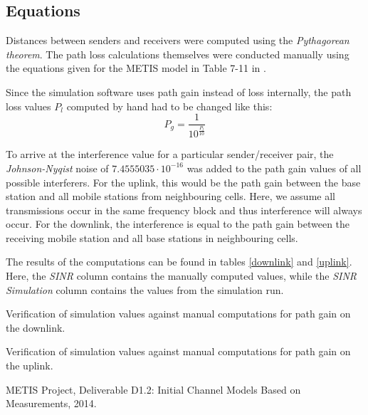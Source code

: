 \documentclass{article}
\begin{document}
	\subsection{Equations}
	Distances between senders and receivers were computed using the \emph{Pythagorean theorem}. The path loss calculations themselves were conducted manually using the equations given for the METIS model in Table 7-11 in \cite{METIS1.2}. 
	
	Since the simulation software uses path gain instead of loss internally, the path loss values $P_l$ computed by hand had to be changed like this:
	\begin{equation}
	\label{gaineq}
	P_g = \frac{1}{10^{\frac{P_l}{10}}}
	\end{equation}
	
	To arrive at the interference value for a particular sender/receiver pair, the \emph{Johnson-Nyqist} noise of $7.4555035\cdot10^{-16}$ was added to the path gain values of all possible interferers. For the uplink, this would be the path gain between the base station and all mobile stations from neighbouring cells. Here, we assume all transmissions occur in the same frequency block and thus interference will always occur. For the downlink, the interference is equal to the path gain between the receiving mobile station and all base stations in neighbouring cells.
	
	The results of the computations can be found in tables \ref{downlink} and \ref{uplink}. Here, the \emph{SINR} column contains the manually computed values, while the \emph{SINR Simulation} column contains the values from the simulation run.  

\begin{table}[h!]
  \begin{center}
    \caption{Verification of simulation values against manual computations for path gain on the downlink.}
    \label{downlink}
  \end{center}
\end{table}

\begin{table}[h!]
  \begin{center}
    \caption{Verification of simulation values against manual computations for path gain on the uplink.}
    \label{uplink}
  \end{center}
\end{table}

\begin{thebibliography}{9}


  METIS Project,
  Deliverable D1.2: Initial Channel Models Based on Measurements,
  2014.

\end{thebibliography}
\end{document}
